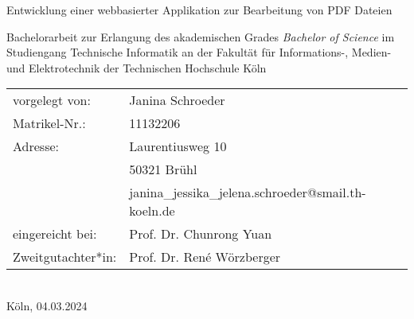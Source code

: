 \begin{titlepage}
%
%
\begin{center}
\end{center}
%
\vfill
%
\begin{huge}
Entwicklung einer webbasierter Applikation zur Bearbeitung von PDF Dateien\\[10mm]
\end{huge}
%
Bachelorarbeit zur Erlangung des akademischen Grades\newline
\emph{Bachelor of Science}\newline
im Studiengang Technische Informatik\newline
an der Fakultät für Informations-, Medien- und Elektrotechnik\newline
der Technischen Hochschule Köln
%
\vfill
%
\begin{tabular}{@{}ll}
vorgelegt von: & Janina Schroeder\\
Matrikel-Nr.:  & 11132206\\
Adresse:       & Laurentiusweg 10\\
               & 50321 Brühl\\
               & janina\_jessika\_jelena.schroeder@smail.th-koeln.de\\[5mm]
eingereicht bei:   & Prof. Dr. Chunrong Yuan\\
Zweitgutachter*in: & Prof. Dr. René Wörzberger
\end{tabular}	
%
\\[10mm]
%
Köln, 04.03.2024%
%
\rmfamily%
%
\end{titlepage}